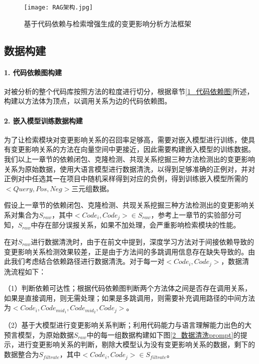 \begin{figure}[htbp]
\centering
\texttt{[image: RAG架构.jpg]}
\caption{基于代码依赖与检索增强生成的变更影响分析方法框架}
\label{2_基于代码依赖与检索增强生成的变更影响分析方法框架}
\end{figure}


\subsection{数据构建}


\paragraph{1. 代码依赖图构建} 对被分析的整个代码库按照方法的粒度进行切分，根据章节\ref{1_代码依赖图}所述，构建以方法体为顶点，以调用关系为边的代码依赖图。

\paragraph{2. 嵌入模型训练数据构建} 为了让检索模块对变更影响关系的召回率足够高，需要对嵌入模型进行训练，使具有变更影响关系的方法在向量空间中更接近，因此需要构建嵌入模型的训练数据。我们以上一章节的依赖闭包、克隆检测、共现关系挖掘三种方法检测出的变更影响关系为原始数据，使用大语言模型进行数据清洗，以得到足够准确的正例对，并对正例对中任选其一在项目中随机采样得到对应的负例，得到训练嵌入模型所需的$<Query,Pos,Neg>$三元组数据。

假设上一章节的依赖闭包、克隆检测、共现关系挖掘三种方法检测出的变更影响关系对集合为$S_{raw}$，其中$<Code_i,Code_j>\in S_{raw}$，参考上一章节的实验部分可知，$S_{raw}$中存在部分误报关系，如果不加处理，会严重影响检索模块的性能。

在对$S_{raw}$进行数据清洗时，由于在前文中提到，深度学习方法对于间接依赖导致的变更影响关系检测效果较差，正是由于方法间的多跳调用信息存在缺失导致的。由此我们考虑结合依赖路径进行数据清洗。对于每一对$<Code_i,Code_j>$，数据清洗流程如下：


（1）判断依赖可达性；根据代码依赖图判断两个方法体之间是否存在调用关系，如果是直接调用，则无需处理；如果是多跳调用，则需要补充调用路径的中间方法为$<Code_i,Code_{mid_1},Code_{mid_2},Code_j>$。

（2）基于大模型进行变更影响关系判断；利用代码能力与语言理解能力出色的大预言模型，为原始数据$S_{raw}$中的每一组数据构建如下图\ref{2_数据清洗prompt}的提示，进行变更影响关系的判断，剔除大模型认为没有变更影响关系的数据，剩下的数据整合为$S_{filtrate}$，其中$<Code_i,Code_j>\in S_{filtrate}$。

